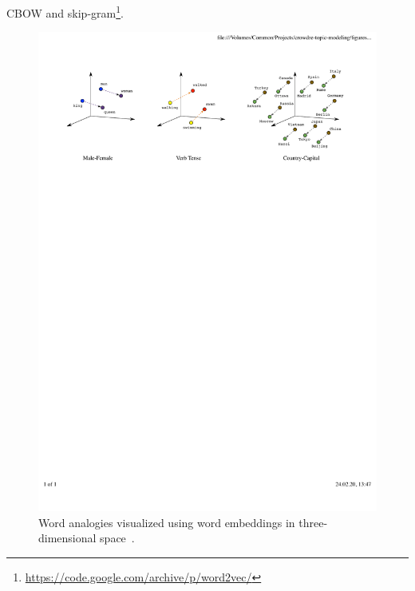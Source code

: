CBOW and skip-gram\footnote{\label{word2vec_link}\url{https://code.google.com/archive/p/word2vec/}}.

\begin{figure}[ht]
  \centering
    \includegraphics[width=\textwidth]{figures/word-embedding-relationships.pdf}
    \caption{Word analogies visualized using word embeddings in three-dimensional space \,\cite{google_embeddings_figure}.}
    \label{fig:word_emb_relationships}
\end{figure}
\FloatBarrier

